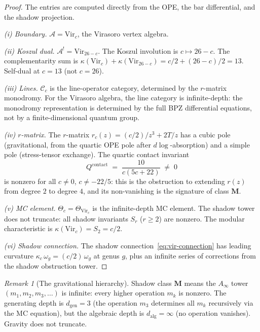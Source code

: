 \documentclass[11pt,reqno]{amsart}
\theoremstyle{definition}
\theoremstyle{remark}
\newtheorem{remark}[theorem]{Remark}
\newcommand{\cA}{\mathcal{A}}
\newcommand{\cC}{\mathcal{C}}
\newcommand{\Ainf}{A_{\infty}}
\newcommand{\Vir}{\mathrm{Vir}}
\numberwithin{equation}{section}
\begin{document}
\begin{proof}
The entries are computed directly from the OPE, the bar differential,
and the shadow projection.

\smallskip\noindent\emph{(i) Boundary.}\enspace
$\cA = \Vir_c$, the Virasoro vertex algebra.

\smallskip\noindent\emph{(ii) Koszul dual.}\enspace
$\cA^! = \Vir_{26-c}$. The Koszul involution is
$c \mapsto 26 - c$. The complementarity sum is
$\kappa(\Vir_c) + \kappa(\Vir_{26-c}) = c/2 + (26-c)/2 = 13$.
Self-dual at $c = 13$ (not $c = 26$).

\smallskip\noindent\emph{(iii) Lines.}\enspace
$\cC_c$ is the line-operator category, determined by the
$r$-matrix monodromy. For the Virasoro algebra, the line
category is infinite-depth: the monodromy representation is
determined by the full BPZ differential equations, not by a
finite-dimensional quantum group.

\smallskip\noindent\emph{(iv) $r$-matrix.}\enspace
The $r$-matrix $r_c(z) = (c/2)/z^3 + 2T/z$ has a cubic pole
(gravitational, from the quartic OPE pole after $d\log$-absorption)
and a simple pole (stress-tensor exchange). The quartic contact
invariant
\begin{equation}\label{eq:quartic}
Q^{\mathrm{contact}}
\;=\;
\frac{10}{c(5c+22)}
\;\neq\; 0
\end{equation}
is nonzero for all $c \neq 0$, $c \neq -22/5$: this is the
obstruction to extending $r(z)$ from degree $2$ to degree $4$, and
its non-vanishing is the signature of class $\mathbf{M}$.

\smallskip\noindent\emph{(v) MC element.}\enspace
$\Theta_c = \Theta_{\Vir_c}$ is the infinite-depth MC element.
The shadow tower does not truncate: all shadow invariants
$S_r$ ($r \geq 2$) are nonzero.
The modular characteristic is
$\kappa(\Vir_c) = S_2 = c/2$.

\smallskip\noindent\emph{(vi) Shadow connection.}\enspace
The shadow connection~\eqref{eq:vir-connection} has leading
curvature $\kappa_c\,\omega_g = (c/2)\,\omega_g$ at genus $g$,
plus an infinite series of corrections from the shadow
obstruction tower.
\end{proof}

\begin{remark}[The gravitational hierarchy]\label{rem:vir-gravity}
Shadow class $\mathbf{M}$ means the $\Ainf$ tower
$(m_1, m_2, m_3, \ldots)$ is infinite: every higher operation
$m_k$ is nonzero. The generating depth is $d_{\mathrm{gen}} = 3$
(the operation $m_3$ determines all $m_k$ recursively via the MC
equation), but the algebraic depth is
$d_{\mathrm{alg}} = \infty$ (no operation vanishes). Gravity
does not truncate.
\end{remark}
\end{document}
